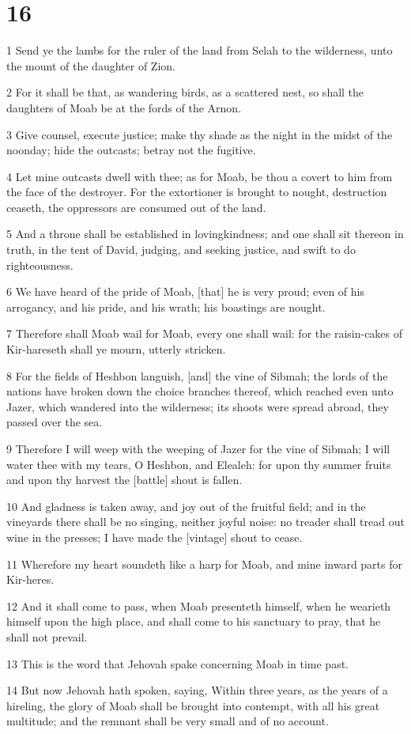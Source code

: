 \chapter{16}

\par 1 Send ye the lambs for the ruler of the land from Selah to the wilderness, unto the mount of the daughter of Zion.
\par 2 For it shall be that, as wandering birds, as a scattered nest, so shall the daughters of Moab be at the fords of the Arnon.
\par 3 Give counsel, execute justice; make thy shade as the night in the midst of the noonday; hide the outcasts; betray not the fugitive.
\par 4 Let mine outcasts dwell with thee; as for Moab, be thou a covert to him from the face of the destroyer. For the extortioner is brought to nought, destruction ceaseth, the oppressors are consumed out of the land.
\par 5 And a throne shall be established in lovingkindness; and one shall sit thereon in truth, in the tent of David, judging, and seeking justice, and swift to do righteousness.
\par 6 We have heard of the pride of Moab, [that] he is very proud; even of his arrogancy, and his pride, and his wrath; his boastings are nought.
\par 7 Therefore shall Moab wail for Moab, every one shall wail: for the raisin-cakes of Kir-hareseth shall ye mourn, utterly stricken.
\par 8 For the fields of Heshbon languish, [and] the vine of Sibmah; the lords of the nations have broken down the choice branches thereof, which reached even unto Jazer, which wandered into the wilderness; its shoots were spread abroad, they passed over the sea.
\par 9 Therefore I will weep with the weeping of Jazer for the vine of Sibmah; I will water thee with my tears, O Heshbon, and Elealeh: for upon thy summer fruits and upon thy harvest the [battle] shout is fallen.
\par 10 And gladness is taken away, and joy out of the fruitful field; and in the vineyards there shall be no singing, neither joyful noise: no treader shall tread out wine in the presses; I have made the [vintage] shout to cease.
\par 11 Wherefore my heart soundeth like a harp for Moab, and mine inward parts for Kir-heres.
\par 12 And it shall come to pass, when Moab presenteth himself, when he wearieth himself upon the high place, and shall come to his sanctuary to pray, that he shall not prevail.
\par 13 This is the word that Jehovah spake concerning Moab in time past.
\par 14 But now Jehovah hath spoken, saying, Within three years, as the years of a hireling, the glory of Moab shall be brought into contempt, with all his great multitude; and the remnant shall be very small and of no account.

